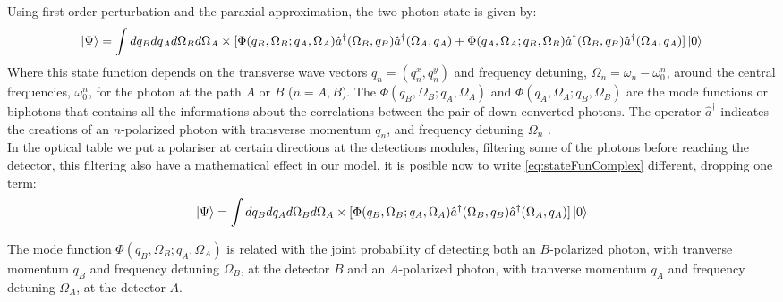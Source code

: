 Using first order perturbation 
and the paraxial approximation, the two-photon state is given by:
\begin{equation}
\label{eq:stateFunComplex}
\ket{\Psi}=\int dq_B dq_A d\Omega_B d\Omega_A 
\times [\Phi(q_B,\Omega_B;q_A,\Omega_A) \hat{a}^{\dagger} (\Omega_B,q_B) \hat{a}^{\dagger}(\Omega_A,q_A) \\
+ \Phi(q_A,\Omega_A;q_B,\Omega_B) \hat{a}^{\dagger}(\Omega_B,q_B) \hat{a}^{\dagger}(\Omega_A,q_A)]   \ket{0}  
\end{equation}
Where this state function depends on the transverse wave vectors $q_n=(q_n^x,q_n^y)$ and frequency detuning, $\Omega_n=\omega_n-\omega_0^n$, 
around the central frequencies, $\omega_0^n$, for the photon at the path $A$ or $B$ ($n=A,B$).
The $\Phi(q_B,\Omega_B;q_A,\Omega_A)$ and $\Phi(q_A,\Omega_A;q_B,\Omega_B)$
are the mode functions or biphotons that contains all the informations about the correlations
between the pair of down-converted photons. The operator $\hat{a}^{\dagger}$ indicates the creations of an $n$-polarized photon with transverse momentum $q_n$, 
and frequency detuning $\Omega_n$ \cite{physicsGhost}. \\

In the optical table we put a polariser at certain directions at the detections modules,
filtering some of the photons before reaching the detector, this filtering also have a mathematical effect in our model, 
it is posible now to write \ref{eq:stateFunComplex} different, dropping one term:
\begin{equation}
\label{eq:stateFun}
\ket{\Psi}=\int dq_B dq_A d\Omega_B d\Omega_A 
\times [\Phi(q_B,\Omega_B;q_A,\Omega_A) \hat{a}^{\dagger} (\Omega_B,q_B) \hat{a}^{\dagger}(\Omega_A,q_A) 
] \ket{0}  
\end{equation}

The mode function  $\Phi(q_B,\Omega_B;q_A,\Omega_A)$ is related with the joint probability of detecting both an $B$-polarized
photon, with tranverse momentum $q_B$ and frequency detuning $\Omega_B$, at the detector $B$ 
and an $A$-polarized
photon, with tranverse momentum $q_A$ and frequency detuning $\Omega_A$, at the detector $A$. 

